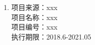 \begin{projects}
\begin{enumerate}
\item 
        项目来源：xxx \\
        项目名称：xxx \\
        项目编号：xxx \\
        执行期限：2018.6-2021.05
\end{enumerate}
\end{projects}